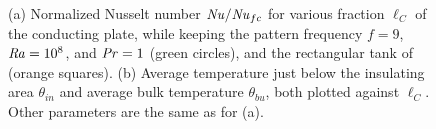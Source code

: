 \documentclass{jfm}
\newcommand\Pran{\mbox{\textit{Pr}}} %
\newcommand\Ray{\mbox{\textit{Ra}}}  %
\newcommand\Nus{\mbox{\textit{Nu}}}  %
\begin{document}
\begin{figure}
\centering
{}
\caption{%
(a) Normalized Nusselt number
$\Nus/\Nus_{fc}$ for various fraction $\ell_C$ of the conducting plate,
while keeping the pattern frequency $f=9$, $\Ray=10^8$, and $\Pran=1$ (green circles),
and the rectangular tank of \cite{wang17} (orange squares).
(b) Average temperature just below the insulating area $\theta_{in}$ and
average bulk temperature $\theta_{bu}$, both plotted against $\ell_C$.
Other parameters are the same as for (a).}
\label{figure9}%
\end{figure}%
\end{document}
